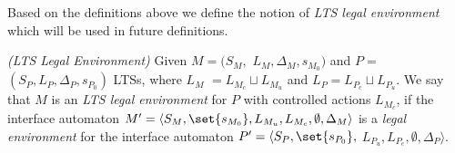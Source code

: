 Based on the definitions above we define the notion of \emph{LTS
legal environment} which will be used in future definitions.

\begin{definition}\label{def:ltslegalEnvironment}
\emph{(LTS Legal Environment)} Given $M = (S_M, $ $ L_M, \Delta_M,
s_{M_0})$ and $P =$ $(S_P,L_P,\Delta_P,s_{P_0})$ LTSs, where $L_M$
$=L_{M_c}\sqcup L_{M_u}$ and $L_P=L_{P_c}\sqcup L_{P_u}$. We say
that $M$ is an \emph{LTS legal environment} for $P$ with controlled
actions $L_{M_c}$, if the interface automaton $M'=\langle S_M,
\set{s_{M_0}}, L_{M_u}, L_{M_c}, \emptyset, \Delta_M \rangle$ is a
\emph{legal environment} for the interface automaton $P'=\langle
S_P, \set{s_{P_0}},$ $L_{P_u}, L_{P_c}, \emptyset, \Delta_P
\rangle$.
\end{definition}